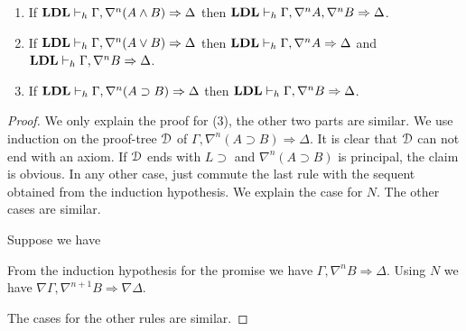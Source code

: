 
\begin{lem}[Inversion]\label{lem:inv} \quad
	\begin{enumerate}
		\item If $\LDL \vdash_h \Gamma, \nabla^n (A \wedge B) \Rightarrow \Delta$ then $\LDL \vdash_h \Gamma, \nabla^n A, \nabla^n B \Rightarrow \Delta$.
		\item If $\LDL \vdash_h \Gamma, \nabla^n (A \vee B) \Rightarrow \Delta$ then $\LDL \vdash_h \Gamma, \nabla^n A \Rightarrow \Delta$ and $\LDL \vdash_h \Gamma, \nabla^n B \Rightarrow \Delta$.
  	\item If $\LDL \vdash_h \Gamma, \nabla^n (A \supset B) \Rightarrow \Delta$ then $\LDL \vdash_h \Gamma, \nabla^n B \Rightarrow \Delta$.
	\end{enumerate}
\end{lem}
\begin{proof}
  We only explain the proof for (3), the other two parts are similar. We use induction on the proof-tree $\D$ of $\Gamma, \nabla^n (A \supset B) \Rightarrow \Delta$. It is clear that $\D$ can not end with an axiom. If $\D$ ends with $L \supset$ and $\nabla^n (A \supset B)$ is principal, the claim is obvious. In any other case, just commute the last rule with the sequent obtained from the induction hypothesis. We explain the case for $N$. The other cases are similar.

  Suppose we have
  \begin{prooftree}
     
  \end{prooftree}
  From the induction hypothesis for the promise we have $\Gamma, \nabla^n B \Rightarrow \Delta$. Using $N$ we have $\nabla \Gamma, \nabla^{n+1} B \Rightarrow \nabla \Delta$.

  The cases for the other rules are similar.
\end{proof}